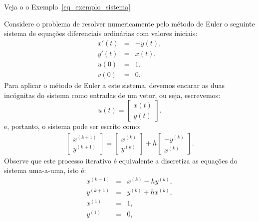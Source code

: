 Veja o  o Exemplo~\ref{eq_exemplo_sistema}
\begin{ex}\label{exemplo_sistema_PVI}Considere o problema de resolver numericamente pelo método de Euler o seguinte sistema de equações diferenciais ordinárias com valores iniciais:
\begin{subequations}\label{eq_exemplo_sistema}
\begin{eqnarray}
x'(t)&=&-y(t),\\
y'(t)&=&x(t),\\
u(0)&=&1.\\
v(0)&=&0.
\end{eqnarray}
\end{subequations}
Para aplicar o método de Euler a este sistema, devemos encarar as duas incógnitas do sistema como entradas de um vetor, ou seja, escrevemos:
 $$u(t)=\left[\begin{array}{c}x(t)\\y(t)\end{array}\right].$$
 e, portanto, o sistema pode ser escrito como:
\begin{eqnarray*}
\left[\begin{array}{c}x^{(k+1)}\\y^{(k+1)}\end{array}\right]=\left[\begin{array}{c}x^{(k)}\\y^{(k)}\end{array}\right]+h\left[\begin{array}{c}-y^{(k)}\\x^{(k)}\end{array}\right].
\end{eqnarray*}
Observe que este processo iterativo é equivalente a discretiza as equações do sistema uma-a-uma, isto é:
\begin{eqnarray*}
x^{(k+1)}&=&x^{(k)}-hy^{(k)},\\
y^{(k+1)}&=&y^{(k)}+hx^{(k)},\\
x^{(1)}&=&1,\\
y^{(1)}&=&0,\\
\end{eqnarray*}
\end{ex}


